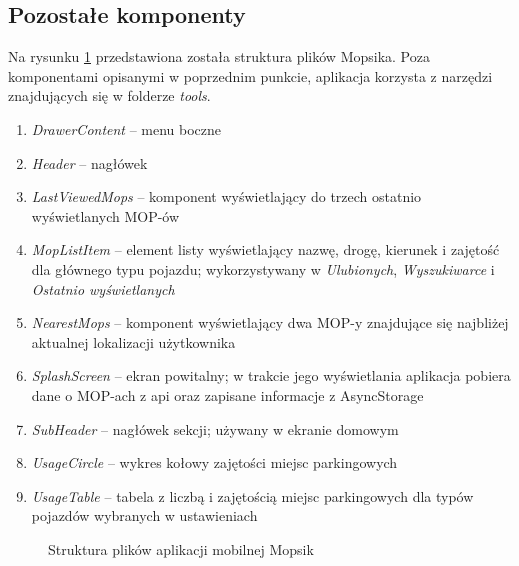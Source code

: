 \subsection{Pozostałe komponenty}
Na rysunku \ref{mopsik_mobile_structure} przedstawiona została struktura plików Mopsika. Poza komponentami opisanymi w poprzednim punkcie, aplikacja korzysta z narzędzi znajdujących się w folderze \textit{tools}.
\begin{enumerate}
\item \textit{DrawerContent} -- menu boczne
\item \textit{Header} -- nagłówek
\item \textit{LastViewedMops} -- komponent wyświetlający do trzech ostatnio wyświetlanych MOP-ów
\item \textit{MopListItem} -- element listy wyświetlający nazwę, drogę, kierunek i zajętość dla głównego typu pojazdu; wykorzystywany w \textit{Ulubionych}, \textit{Wyszukiwarce} i \textit{Ostatnio wyświetlanych}
\item \textit{NearestMops} -- komponent wyświetlający dwa MOP-y znajdujące się najbliżej aktualnej lokalizacji użytkownika
\item \textit{SplashScreen} -- ekran powitalny; w trakcie jego wyświetlania aplikacja pobiera dane o MOP-ach z api oraz zapisane informacje z AsyncStorage
\item \textit{SubHeader} -- nagłówek sekcji; używany w ekranie domowym
\item \textit{UsageCircle} -- wykres kołowy zajętości miejsc parkingowych
\item \textit{UsageTable} -- tabela z liczbą i zajętością miejsc parkingowych dla typów pojazdów wybranych w ustawieniach
\end{enumerate}
\begin{figure}[!htb]
\caption{Struktura plików aplikacji mobilnej Mopsik}
\label{mopsik_mobile_structure}
\end{figure}



